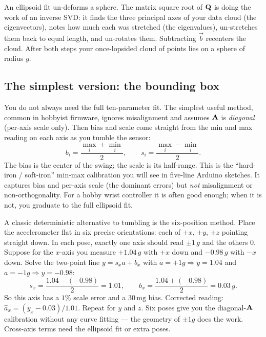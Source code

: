 \begin{happeningbox}
An ellipsoid fit un-deforms a sphere. The
matrix square root of $\mathbf{Q}$ is doing the work of an inverse SVD: it finds the
three principal axes of your data cloud (the eigenvectors), notes how much each
was stretched (the eigenvalues), un-stretches them back to equal length, and
un-rotates them. Subtracting $\vec{b}$ recenters the cloud. After both steps your
once-lopsided cloud of points lies on a sphere of radius $g$.
\end{happeningbox}

\subsection{The simplest version: the bounding box}
\label{ch35:bounding-box}

You do not always need the full ten-parameter fit. The simplest useful method,
common in hobbyist firmware, ignores misalignment and assumes $\mathbf{A}$ is
\emph{diagonal} (per-axis scale only). Then bias and scale come straight from the
min and max reading on each axis as you tumble the sensor:
\begin{equation}
  b_i = \frac{\max_i + \min_i}{2}, \qquad
  s_i = \frac{\max_i - \min_i}{2}.
  \label{ch35:minmax}
\end{equation}
The bias is the center of the swing; the scale is its half-range. This is the
``hard-iron / soft-iron'' min-max calibration you will see in five-line Arduino
sketches. It captures bias and per-axis scale (the dominant errors) but
\emph{not} misalignment or non-orthogonality. For a hobby wrist controller it is
often good enough; when it is not, you graduate to the full ellipsoid fit.

\begin{example}
\label{ch35:ex-sixpos}
A classic deterministic alternative to tumbling is the six-position method. Place the
accelerometer flat in six precise orientations: each of $\pm x$, $\pm y$, $\pm z$
pointing straight down. In each pose, exactly one axis should read $\pm 1\,g$ and
the others $0$. Suppose for the $x$-axis you measure $+1.04\,g$ with $+x$ down and
$-0.98\,g$ with $-x$ down. Solve the two-point line $y = s_x a + b_x$ with
$a=+1g\Rightarrow y=1.04$ and $a=-1g\Rightarrow y=-0.98$:
\[
  s_x = \frac{1.04-(-0.98)}{2} = 1.01, \qquad
  b_x = \frac{1.04+(-0.98)}{2} = 0.03\,g.
\]
So this axis has a $1\%$ scale error and a $30\,\mathrm{mg}$ bias. Corrected
reading: $\hat a_x = (y_x - 0.03)/1.01$. Repeat for $y$ and $z$. Six poses give
you the diagonal-$\mathbf{A}$ calibration without any curve fitting --- the
geometry of $\pm 1g$ does the work. Cross-axis terms need the ellipsoid fit or
extra poses.
\end{example}


